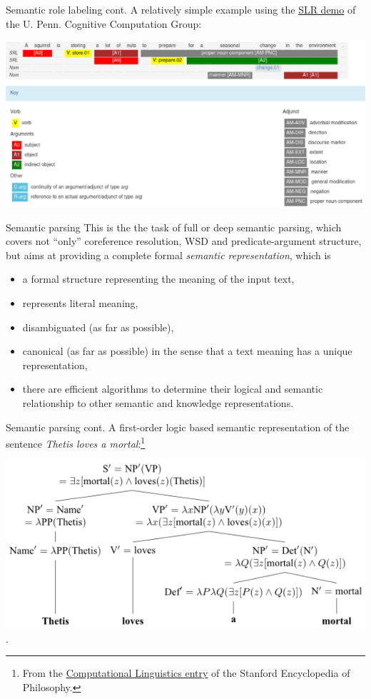 \documentclass[style=upen, size=14pt]{powerdot}
\begin{document}
\begin{slide}[toc=]{Semantic role labeling cont.}
  A relatively simple example using the
  \href{https://cogcomp.seas.upenn.edu/page/demo_view/srl}{ SLR demo} of the U.
  Penn. Cognitive Computation Group:\bigskip
  
  \includegraphics[width=1\textwidth]{figures/slr.eps}
\end{slide}

\begin{slide}[toc=Semantic parsing]{Semantic parsing}
  This is the the task of full or deep semantic parsing, which covers not
  ``only'' coreference resolution, WSD and predicate-argument structure, but
  aims at providing a complete formal \emph{semantic representation}, which is
  \begin{itemize}
  \item a formal structure representing the meaning of the input text,
  \item represents literal meaning,
  \item disambiguated (as far as possible),
  \item canonical (as far as possible) in the sense that a text meaning has a
    unique representation,
  \item there are efficient algorithms to determine their logical and semantic
    relationship to other semantic and knowledge representations.
  \end{itemize}
\end{slide}

\begin{slide}[toc=]{Semantic parsing cont.}
  A first-order logic based semantic representation of the sentence \emph{Thetis
    loves a mortal}:\footnote{From the
    \href{https://plato.stanford.edu/entries/computational-linguistics/}{Computational
      Linguistics entry} of the Stanford Encyclopedia of Philosophy.}\bigskip

  \includegraphics[width=1\textwidth]{figures/semrep.eps}.
\end{slide}
\end{document}
